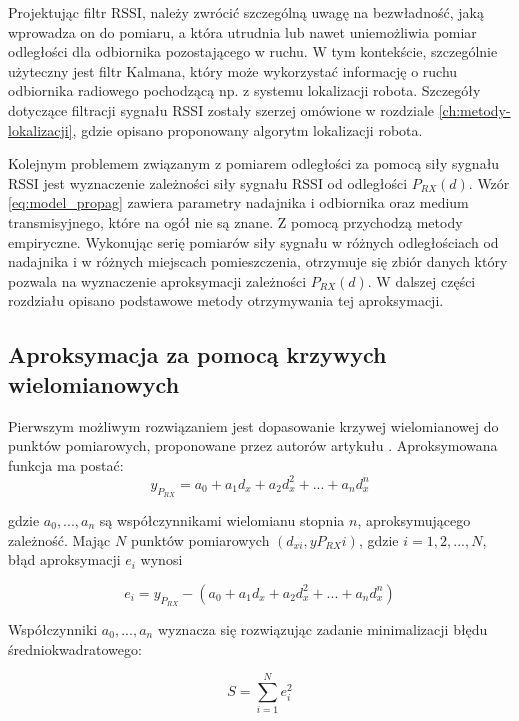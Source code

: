 Projektując filtr RSSI, należy zwrócić szczególną uwagę na bezwładność, jaką wprowadza on do pomiaru, a która utrudnia lub nawet uniemożliwia pomiar odległości dla odbiornika pozostającego w ruchu. W tym kontekście, szczególnie użyteczny jest filtr Kalmana, który może wykorzystać informację o ruchu odbiornika radiowego pochodzącą np. z systemu lokalizacji robota. Szczegóły dotyczące filtracji sygnału RSSI zostały szerzej omówione w rozdziale \ref{ch:metody-lokalizacji}, gdzie opisano proponowany algorytm lokalizacji robota.

Kolejnym problemem związanym z pomiarem odległości za pomocą siły sygnału RSSI jest wyznaczenie zależności siły sygnału RSSI od odległości $P_{RX}(d)$. Wzór \ref{eq:model_propag} zawiera parametry nadajnika i odbiornika oraz medium transmisyjnego, które na ogół nie są znane. Z pomocą przychodzą metody empiryczne. Wykonując serię pomiarów siły sygnału w różnych odległościach od nadajnika i w różnych miejscach pomieszczenia, otrzymuje się zbiór danych który pozwala na wyznaczenie aproksymacji zależności $P_{RX}(d)$. W dalszej części rozdziału opisano podstawowe metody otrzymywania tej aproksymacji.

\subsection{Aproksymacja za pomocą krzywych wielomianowych}
Pierwszym możliwym rozwiązaniem jest dopasowanie krzywej wielomianowej do punktów pomiarowych, proponowane przez autorów artykułu \cite{rssi}. Aproksymowana funkcja ma postać:
\begin{equation}
\label{eq:approx_poly}
  y_{P_{RX}} = a_0 + a_1 d_x + a_2 d_x^2 + ... + a_n d_x^n
\end{equation}

gdzie $a_0, ..., a_n$ są współczynnikami wielomianu stopnia $n$, aproksymującego zależność. Mając $N$ punktów pomiarowych $(d_{xi}, y{P_{RX}i})$, gdzie $i = 1,2, ..., N$, błąd aproksymacji $e_i$ wynosi

\begin{equation}
\label{eq:approx_poly_e}
  e_i = y_{P_{RX}} -( a_0 + a_1 d_x + a_2 d_x^2 + ... + a_n d_x^n )
\end{equation}

Współczynniki $a_0, ..., a_n$ wyznacza się rozwiązując zadanie minimalizacji błędu średniokwadratowego:

\begin{equation}
\label{eq:approx_poly_mse}
  S = \sum_{i=1}^{N} e_i^2
\end{equation}

